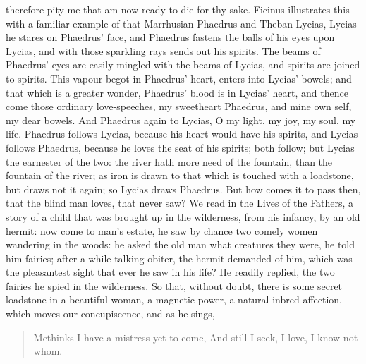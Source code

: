 therefore pity me that am now ready to die for thy sake. Ficinus
illustrates this with a familiar example of that Marrhusian Phaedrus
and Theban Lycias, Lycias he stares on Phaedrus' face, and
Phaedrus fastens the balls of his eyes upon Lycias, and with those
sparkling rays sends out his spirits. The beams of Phaedrus' eyes are
easily mingled with the beams of Lycias, and spirits are joined to
spirits. This vapour begot in Phaedrus' heart, enters into Lycias'
bowels; and that which is a greater wonder, Phaedrus' blood is in
Lycias' heart, and thence come those ordinary love-speeches, my
sweetheart Phaedrus, and mine own self, my dear bowels. And Phaedrus
again to Lycias, O my light, my joy, my soul, my life. Phaedrus follows
Lycias, because his heart would have his spirits, and Lycias follows
Phaedrus, because he loves the seat of his spirits; both follow; but
Lycias the earnester of the two: the river hath more need of the
fountain, than the fountain of the river; as iron is drawn to that
which is touched with a loadstone, but draws not it again; so Lycias
draws Phaedrus. But how comes it to pass then, that the blind man
loves, that never saw? We read in the Lives of the Fathers, a story of
a child that was brought up in the wilderness, from his infancy, by an
old hermit: now come to man's estate, he saw by chance two comely women
wandering in the woods: he asked the old man what creatures they were,
he told him fairies; after a while talking obiter, the hermit demanded
of him, which was the pleasantest sight that ever he saw in his life?
He readily replied, the two fairies he spied in the wilderness.
So that, without doubt, there is some secret loadstone in a beautiful
woman, a magnetic power, a natural inbred affection, which moves our
concupiscence, and as he sings,

\begin{verse}%
Methinks I have a mistress yet to come,
And still I seek, I love, I know not whom.
\end{verse}%

